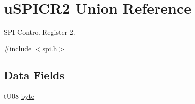 \hypertarget{unionu_s_p_i_c_r2}{}\section{u\+S\+P\+I\+C\+R2 Union Reference}
\label{unionu_s_p_i_c_r2}


S\+P\+I Control Register 2.  




{\ttfamily \#include $<$spi.\+h$>$}

\subsection*{Data Fields}
\begin{DoxyCompactItemize}
\item 
\hypertarget{unionu_s_p_i_c_r2_aba308d63db050aed25cfd36c37e41ad4}{}t\+U08 \hyperlink{unionu_s_p_i_c_r2_aba308d63db050aed25cfd36c37e41ad4}{byte}\label{unionu_s_p_i_c_r2_aba308d63db050aed25cfd36c37e41ad4}


\end{DoxyCompactItemize}

